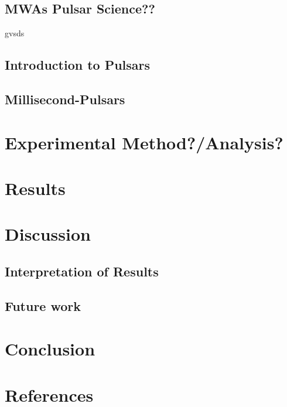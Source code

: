 \documentclass[draft]{article}
\begin{document}
\subsection{MWAs Pulsar Science?? }
gvsds
\subsection{Introduction to Pulsars}
\subsection{Millisecond-Pulsars}

\section{Experimental Method?/Analysis?}

\section{Results}

\section{Discussion}
\subsection{Interpretation of Results}
\subsection{Future work}

\section{Conclusion}

\section{References}
\end{document}
